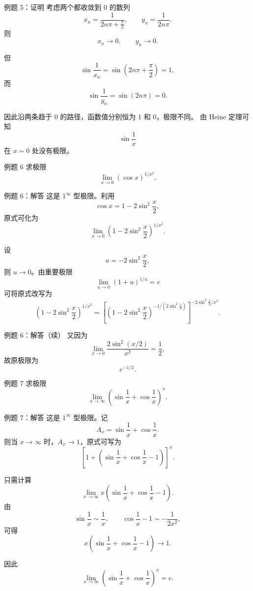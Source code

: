 ﻿\documentclass[aspectratio=169,11pt]{ctexbeamer}
\begin{document}
\begin{frame}[allowframebreaks]{例题 5：证明}
考虑两个都收敛到 $0$ 的数列
\[
  x_n=\frac{1}{2n\pi+\frac{\pi}{2}},\qquad
  y_n=\frac{1}{2n\pi}.
\]
则
\[
  x_n\to 0,\qquad y_n\to 0.
\]

但
\[
  \sin\frac1{x_n}=\sin\left(2n\pi+\frac{\pi}{2}\right)=1,
\]
而
\[
  \sin\frac1{y_n}=\sin(2n\pi)=0.
\]

因此沿两条趋于 $0$ 的路径，函数值分别恒为 $1$ 和 $0$，极限不同。
由 Heine 定理可知
\[
  \sin\frac1x
\]
在 $x=0$ 处没有极限。
\end{frame}

\begin{frame}{例题 6}
求极限
\[
  \lim_{x\to 0}(\cos x)^{1/x^2}.
\]
\end{frame}

\begin{frame}{例题 6：解答}
这是 $1^\infty$ 型极限。利用
\[
  \cos x=1-2\sin^2\frac{x}{2},
\]
原式可化为
\[
  \lim_{x\to 0}\left(1-2\sin^2\frac{x}{2}\right)^{1/x^2}.
\]

设
\[
  u=-2\sin^2\frac{x}{2},
\]
则 $u\to 0$。由重要极限
\[
  \lim_{u\to 0}(1+u)^{1/u}=e
\]
可将原式改写为
\[
  \left(1-2\sin^2\frac{x}{2}\right)^{1/x^2}
  =
  \left[\left(1-2\sin^2\frac{x}{2}\right)^{-1/\left(2\sin^2\frac{x}{2}\right)}\right]^{-2\sin^2\frac{x}{2}/x^2}.
\]
\end{frame}

\begin{frame}{例题 6：解答（续）}
又因为
\[
  \lim_{x\to 0}\frac{2\sin^2(x/2)}{x^2}
  =
  \frac12,
\]
故原极限为
\[
  e^{-1/2}.
\]
\end{frame}

\begin{frame}{例题 7}
求极限
\[
  \lim_{x\to\infty}\left(\sin\frac1x+\cos\frac1x\right)^x.
\]
\end{frame}

\begin{frame}[allowframebreaks]{例题 7：解答}
这是 $1^\infty$ 型极限。记
\[
  A_x=\sin\frac1x+\cos\frac1x.
\]
则当 $x\to\infty$ 时，$A_x\to 1$，原式可写为
\[
  \left[1+\left(\sin\frac1x+\cos\frac1x-1\right)\right]^x.
\]

只需计算
\[
  \lim_{x\to\infty}x\left(\sin\frac1x+\cos\frac1x-1\right).
\]
由
\[
  \sin\frac1x\sim \frac1x,\qquad
  \cos\frac1x-1\sim -\frac{1}{2x^2},
\]
可得
\[
  x\left(\sin\frac1x+\cos\frac1x-1\right)\to 1.
\]

因此
\[
  \lim_{x\to\infty}\left(\sin\frac1x+\cos\frac1x\right)^x=e.
\]
\end{frame}
\end{document}
